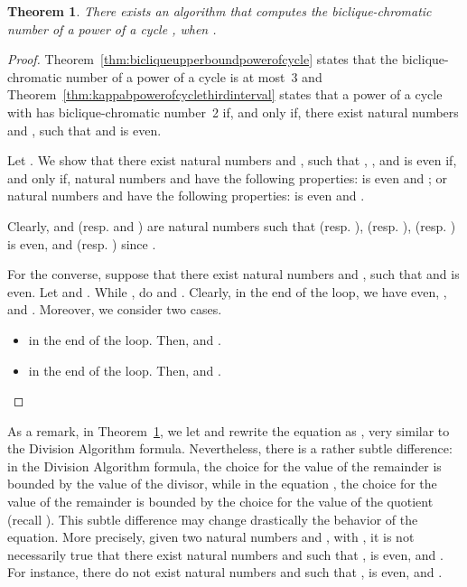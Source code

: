 \documentclass{article}
\newtheorem{theorem}{Theorem}
\begin{document}
\begin{theorem}
\label{thm:algoritmopowerofcycle}
 There exists an algorithm that computes the biclique-chromatic
 number of a power of a cycle , when .
\end{theorem}

\begin{proof}

Theorem~\ref{thm:bicliqueupperboundpowerofcycle} states that the
biclique-chromatic number of a power of a cycle  is at most~3 and
Theorem~\ref{thm:kappabpowerofcyclethirdinterval} states that a power of a cycle
 with  has biclique-chromatic number~2 if, and only if,
there exist natural numbers  and , such that  and  is even.

Let . We show that there exist natural numbers  and , such that
, , and  is even if, and only if, natural numbers  and  have the
following properties:  is even and ; or 
natural numbers  and  have the following properties:  is even and . 

Clearly,  and  (resp.  and ) are natural numbers such that
 (resp. ),  (resp. ),  (resp. ) is even, and  (resp. ) since .

For the converse, suppose that there exist natural numbers  and , such
that  and  is even. Let  and . While , do  and .
Clearly, in the end of the loop, we have  even, , and
. Moreover, we consider two cases.

\begin{itemize}
  \item  in the end of the loop. Then,  and .
  \item  in the end of the loop. Then,  and .
\end{itemize}
\end{proof}

As a remark, in Theorem~\ref{thm:algoritmopowerofcycle},
we let  and rewrite the equation  as ,
very similar to the Division Algorithm formula. Nevertheless, there is a rather
subtle difference: in the Division Algorithm formula, the choice for the
value of the remainder is bounded by the value of the divisor, while in the
equation , the choice for the value of the remainder is bounded by
the choice for the value of the quotient (recall ). This subtle
difference may change drastically the behavior of the equation. More precisely,
given two natural numbers  and , with , it is not
necessarily true that there exist natural numbers  and  such that ,  is even, and . For instance, there do not exist
natural numbers  and  such that ,  is even, and .
\end{document}
